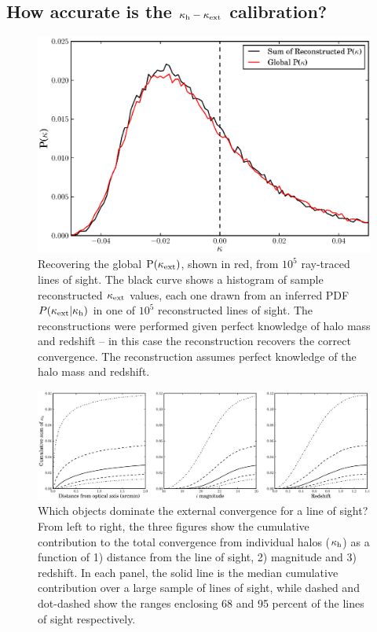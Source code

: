 \documentclass[useAMS,usenatbib]{mn2e}
\begin{document}

\subsection{How accurate is the $\kappa_{\rm h} - \kappa_{\rm ext}$ calibration?}

\begin{figure}
\includegraphics[width=\columnwidth]{figs/globaldist.eps}
\caption[magcut]{Recovering the global ${\rm P}(\kappa_{\rm ext})$, shown in red, 
from $10^{5}$ ray-traced lines of
sight. The black curve shows a histogram of 
sample reconstructed 
$\kappa_{\rm ext}$ values, each one drawn from an inferred PDF 
$P(\kappa_{\rm ext}|\kappa_{\rm h})$ in one of $10^{5}$ reconstructed lines of sight. 
The reconstructions were performed given
perfect knowledge of halo mass and redshift -- in this case
the reconstruction recovers the correct convergence. The reconstruction assumes
perfect knowledge of the halo mass and redshift.}
\label{fig:globaldist}
\end{figure}

\begin{figure}
\includegraphics[width=\textwidth]{figs/where_is_the_kappa.eps}
\caption[magcut]{Which objects dominate the external convergence for a line of
sight? From left to right, the three figures show the cumulative contribution
to the total  convergence from individual halos ($\kappa_{\rm h}$) as a function of
1)  distance from the line of sight, 2) magnitude and 3) redshift.   In each
panel, the solid line is the median cumulative contribution over a large
sample of lines of sight, while dashed and dot-dashed show the ranges enclosing 68
and 95 percent of the lines of sight respectively.}
\label{fig:where}
\end{figure}
\end{document}

